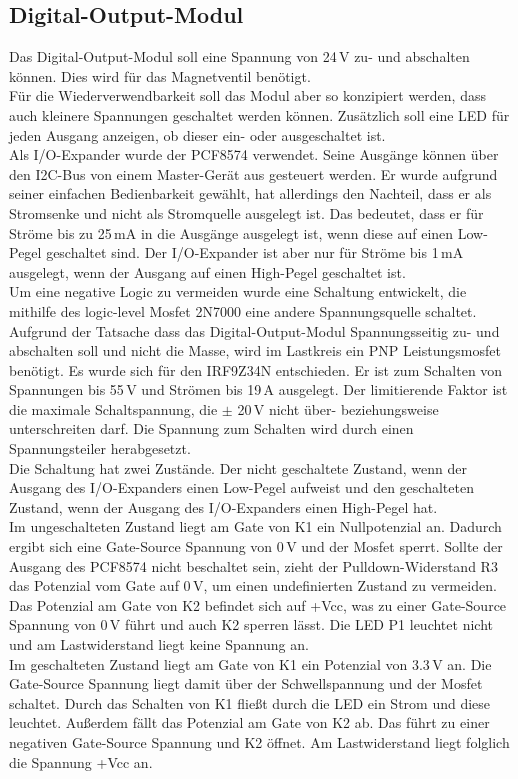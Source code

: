 \subsection{Digital-Output-Modul}
Das Digital-Output-Modul soll eine Spannung von 24\,V zu- und abschalten können. Dies wird für das Magnetventil benötigt.
\\
Für die Wiederverwendbarkeit soll das Modul aber so konzipiert werden, dass auch kleinere Spannungen geschaltet werden können. Zusätzlich soll eine LED für jeden Ausgang anzeigen, ob dieser ein- oder ausgeschaltet ist.
\\
Als I/O-Expander wurde der PCF8574 verwendet. Seine Ausgänge können über den I2C-Bus von einem Master-Gerät aus gesteuert werden. Er wurde aufgrund seiner einfachen Bedienbarkeit gewählt, hat allerdings den Nachteil, dass er als Stromsenke und nicht als Stromquelle ausgelegt ist. Das bedeutet, dass er für Ströme bis zu 25\,mA in die Ausgänge ausgelegt ist, wenn diese auf einen Low-Pegel geschaltet sind. Der I/O-Expander ist aber nur für Ströme bis 1\,mA ausgelegt, wenn der Ausgang auf einen High-Pegel geschaltet ist.
\cite{pcf8574_datasheet}
\\
Um eine negative Logic zu vermeiden wurde eine Schaltung entwickelt, die mithilfe des logic-level Mosfet 2N7000 eine andere Spannungsquelle schaltet. Aufgrund der Tatsache dass das Digital-Output-Modul Spannungsseitig zu- und abschalten soll und nicht die Masse, wird im Lastkreis ein PNP Leistungsmosfet benötigt. Es wurde sich für den IRF9Z34N entschieden. Er ist zum Schalten von Spannungen bis 55\,V und Strömen bis 19\,A ausgelegt. Der limitierende Faktor ist die maximale Schaltspannung, die \(\pm\) 20\,V nicht über- beziehungsweise unterschreiten darf. Die Spannung zum Schalten wird durch einen Spannungsteiler herabgesetzt.
\cite{IRF9Z34N_datasheet}
\\
Die Schaltung hat zwei Zustände. Der nicht geschaltete Zustand, wenn der Ausgang des I/O-Expanders einen Low-Pegel aufweist und den geschalteten Zustand, wenn der Ausgang des I/O-Expanders einen High-Pegel hat.
\\
Im ungeschalteten Zustand liegt am Gate von K1 ein Nullpotenzial an. Dadurch ergibt sich eine Gate-Source Spannung von 0\,V und der Mosfet sperrt. Sollte der Ausgang des PCF8574 nicht beschaltet sein, zieht der Pulldown-Widerstand R3 das Potenzial vom Gate auf 0\,V, um einen undefinierten Zustand zu vermeiden. Das Potenzial am Gate von K2 befindet sich auf +Vcc, was zu einer Gate-Source Spannung von 0\,V führt und auch K2 sperren lässt. Die LED P1 leuchtet nicht und am Lastwiderstand liegt keine Spannung an.
\\
Im geschalteten Zustand liegt am Gate von K1 ein Potenzial von 3.3\,V an. Die Gate-Source Spannung liegt damit über der Schwellspannung und der Mosfet schaltet. Durch das Schalten von K1 fließt durch die LED ein Strom und diese leuchtet. Außerdem fällt das Potenzial am Gate von K2 ab. Das führt zu einer negativen Gate-Source Spannung und K2 öffnet. Am Lastwiderstand liegt folglich die Spannung +Vcc an.

